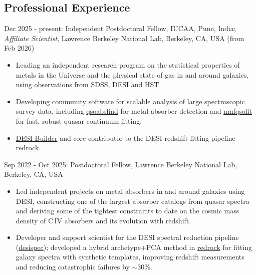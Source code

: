 \documentclass[12pt,letterpaper]{article}
\begin{document}
\subsection{Professional Experience}
\begin{list}{}{\cvlist}

\item Dec 2025 - present: Independent Postdoctoral Fellow, IUCAA, Pune, India; \textit{Affiliate Scientist}, Lawrence Berkeley National Lab, Berkeley, CA, USA (from Feb 2026) \\

\begin{itemize}
  \item Leading an independent research program on the statistical properties of metals in the Universe and the physical state of gas in and around galaxies, using observations from SDSS, DESI and HST.

  \item Developing community software for scalable analysis of large spectroscopic survey data, including \href{https://github.com/abhi0395/qsoabsfind}{qsoabsfind} for metal absorber detection and \href{https://github.com/abhi0395/nmfqsofit}{nmfqsofit} for fast, robust quasar continuum fitting.

  \item \href{https://www.desi.lbl.gov/collaboration/desi-builders/}{DESI Builder} and core contributor to the DESI redshift-fitting pipeline \href{https://github.com/desihub/redrock}{redrock}.

  \vspace{-1mm}
\end{itemize}

\item Sep 2022 - Oct 2025: Postdoctoral Fellow, Lawrence Berkeley National Lab, Berkeley, CA, USA \\
\begin{itemize}
  \item Led independent projects on metal absorbers in and around galaxies using DESI, constructing one of the largest absorber catalogs from quasar spectra and deriving some of the tightest constraints to date on the cosmic mass density of C\,IV absorbers and its evolution with redshift.

  \item Developer and support scientist for the DESI spectral reduction pipeline (\href{https://github.com/desihub/desispec}{desispec}); developed a hybrid archetype+PCA method in \href{https://github.com/desihub/redrock}{redrock} for fitting galaxy spectra with synthetic templates, improving redshift measurements and reducing catastrophic failures by $\sim 30\%$.


\end{itemize}
\end{list}
\end{document}
